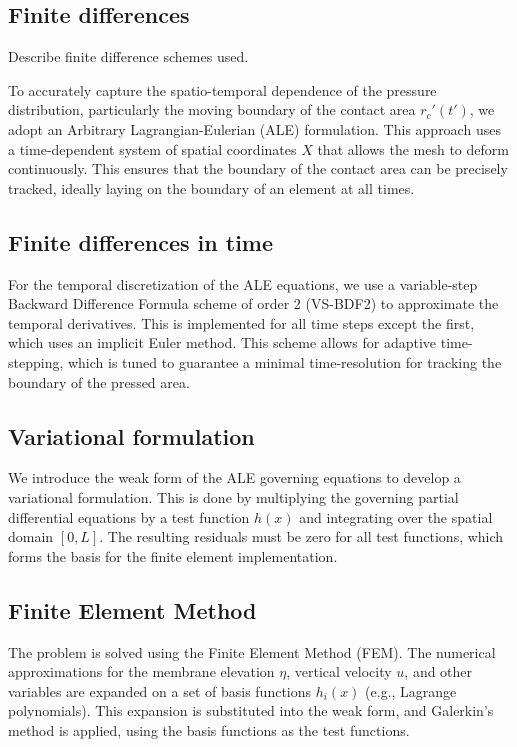 \documentclass{article}
\begin{document}
\subsection{Finite differences}
Describe finite difference schemes used.


To accurately capture the spatio-temporal dependence of the pressure distribution, particularly the moving boundary of the contact area $r_c'(t')$, we adopt an Arbitrary Lagrangian-Eulerian (ALE) formulation. This approach uses a time-dependent system of spatial coordinates $X$ that allows the mesh to deform continuously. This ensures that the boundary of the contact area can be precisely tracked, ideally laying on the boundary of an element at all times.

\subsection{Finite differences in time}
For the temporal discretization of the ALE equations, we use a variable-step Backward Difference Formula scheme of order 2 (VS-BDF2) to approximate the temporal derivatives. This is implemented for all time steps except the first, which uses an implicit Euler method. This scheme allows for adaptive time-stepping, which is tuned to guarantee a minimal time-resolution for tracking the boundary of the pressed area.

\subsection{Variational formulation}
We introduce the weak form of the ALE governing equations to develop a variational formulation. This is done by multiplying the governing partial differential equations by a test function $h(x)$ and integrating over the spatial domain $[0,L]$. The resulting residuals must be zero for all test functions, which forms the basis for the finite element implementation.

\subsection{Finite Element Method}
The problem is solved using the Finite Element Method (FEM). The numerical approximations for the membrane elevation $\eta$, vertical velocity $u$, and other variables are expanded on a set of basis functions $h_i(x)$ (e.g., Lagrange polynomials). This expansion is substituted into the weak form, and Galerkin's method is applied, using the basis functions as the test functions.
\end{document}
